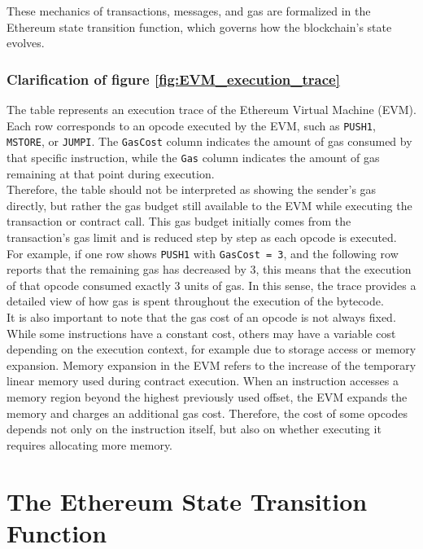 \documentclass{scrbook}
\begin{document}
These mechanics of transactions, messages, and gas are formalized in the Ethereum state transition function, which governs how the blockchain's state evolves.

\subsection{Clarification of figure \ref{fig:EVM_execution_trace}}

The table represents an execution trace of the Ethereum Virtual Machine (EVM). Each row corresponds to an opcode executed by the EVM, such as \texttt{PUSH1}, \texttt{MSTORE}, or \texttt{JUMPI}. The \texttt{GasCost} column indicates the amount of gas consumed by that specific instruction, while the \texttt{Gas} column indicates the amount of gas remaining at that point during execution.\\

Therefore, the table should not be interpreted as showing the sender's gas directly, but rather the gas budget still available to the EVM while executing the transaction or contract call. This gas budget initially comes from the transaction's gas limit and is reduced step by step as each opcode is executed.\\

For example, if one row shows \texttt{PUSH1} with \texttt{GasCost = 3}, and the following row reports that the remaining gas has decreased by 3, this means that the execution of that opcode consumed exactly 3 units of gas. In this sense, the trace provides a detailed view of how gas is spent throughout the execution of the bytecode.\\

It is also important to note that the gas cost of an opcode is not always fixed. While some instructions have a constant cost, others may have a variable cost depending on the execution context, for example due to storage access or memory expansion. Memory expansion in the EVM refers to the increase of the temporary linear memory used during contract execution. When an instruction accesses a memory region beyond the highest previously used offset, the EVM expands the memory and charges an additional gas cost. Therefore, the cost of some opcodes depends not only on the instruction itself, but also on whether executing it requires allocating more memory.

\chapter{The Ethereum State Transition Function}
\end{document}
